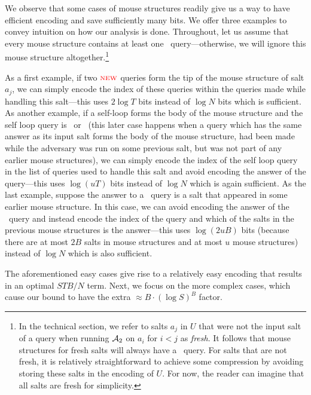 We observe that some cases of mouse structures readily give us a way to have efficient encoding and save sufficiently many bits. We offer three examples to convey intuition on how our analysis is done.
Throughout, let us assume that every mouse structure contains at least one \new\ query—otherwise, we will ignore this mouse structure altogether.\footnote{In the technical section, we refer to salts $a_j$ in $U$ that were not the input salt of a query when running $\mathcal{A}_2$ on $a_i$ for $i<j$ as \emph{fresh}. It follows that mouse structures for fresh salts will always have a \new\ query. For salts that are not fresh, it is relatively straightforward to achieve some compression by avoiding storing these salts in the encoding of $U$. For now, the reader can imagine that all salts are fresh for simplicity.} 

As a first example, if two ${\color{red} \textsc{new}}$ queries form the tip of the mouse structure of salt $a_j$, we can simply encode the index of these queries within the queries made while handling this salt—this uses $2\log T$ bits instead of $\log N$ bits which is sufficient. As another example, if a self-loop forms the body of the mouse structure and the self loop query is \new\ or \urep\ (this later case happens when a query which has the same answer as its input salt forms the body of the mouse structure, had been made while the adversary was run on some previous salt, but was not part of any earlier mouse structures), we can simply encode the index of the self loop query in the list of queries used to handle this salt and avoid encoding the answer of the query—this uses $\log (uT)$ bits instead of $\log N$ which is again sufficient. As the last example, suppose the answer to a \new\ query is a salt that appeared in some earlier mouse structure. In this case, we can avoid encoding the answer of the \new\ query and instead encode the index of the query and which of the salts in the previous mouse structures is the answer—this uses $\log (2uB)$ bits (because there are at most $2B$ salts in mouse structures and at most $u$ mouse structures) instead of $\log N$ which is also sufficient. 


 The aforementioned easy cases give rise to a relatively easy encoding that results in an optimal $STB/N$ term. Next, we focus on the more complex cases, which cause our bound to have the extra $\approx B\cdot (\log S)^B$ factor.

